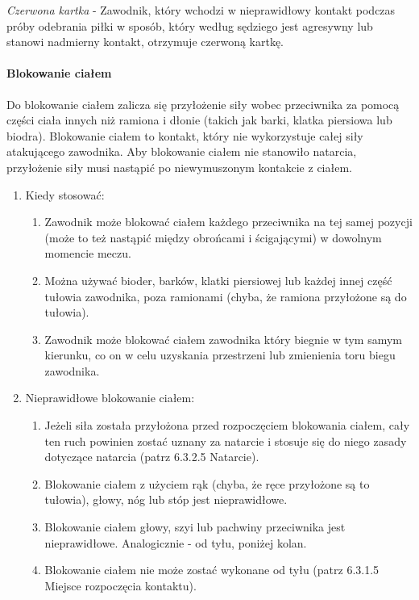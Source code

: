 \documentclass[12pt]{article}
\begin{document}
\emph{Czerwona kartka} - Zawodnik, który wchodzi w nieprawidłowy kontakt
podczas próby odebrania piłki w sposób, który według sędziego jest
agresywny lub stanowi nadmierny kontakt, otrzymuje czerwoną kartkę.

\paragraph{Blokowanie ciałem}
Do blokowanie ciałem zalicza się
przyłożenie siły wobec przeciwnika za pomocą części ciała innych niż
ramiona i dłonie (takich jak barki, klatka piersiowa lub biodra).
Blokowanie ciałem to kontakt, który nie wykorzystuje całej siły
atakującego zawodnika. Aby blokowanie ciałem nie stanowiło natarcia,
przyłożenie siły musi nastąpić po niewymuszonym kontakcie z ciałem.

\begin{enumerate}
	\item
	      Kiedy stosować:

	      \begin{enumerate}
		      \item
		            Zawodnik może blokować ciałem każdego przeciwnika na tej samej
		            pozycji (może to też nastąpić między obrońcami i ścigającymi) w
		            dowolnym momencie meczu.
		      \item
		            Można używać bioder, barków, klatki piersiowej lub każdej innej
		            część tułowia zawodnika, poza ramionami (chyba, że ramiona
		            przyłożone są do tułowia).
		      \item
		            Zawodnik może blokować ciałem zawodnika który biegnie w tym samym
		            kierunku, co on w celu uzyskania przestrzeni lub zmienienia toru
		            biegu zawodnika.
	      \end{enumerate}
	\item
	      Nieprawidłowe blokowanie ciałem:

	      \begin{enumerate}
		      \item
		            Jeżeli siła została przyłożona przed rozpoczęciem blokowania ciałem,
		            cały ten ruch powinien zostać uznany za natarcie i stosuje się do
		            niego zasady dotyczące natarcia (patrz 6.3.2.5 Natarcie).
		      \item
		            Blokowanie ciałem z użyciem rąk (chyba, że ręce przyłożone są to
		            tułowia), głowy, nóg lub stóp jest nieprawidłowe.
		      \item
		            Blokowanie ciałem głowy, szyi lub pachwiny przeciwnika jest
		            nieprawidłowe. Analogicznie - od tyłu, poniżej kolan.
		      \item
		            Blokowanie ciałem nie może zostać wykonane od tyłu (patrz 6.3.1.5
		            Miejsce rozpoczęcia kontaktu).
	      \end{enumerate}
\end{enumerate}
\end{document}
